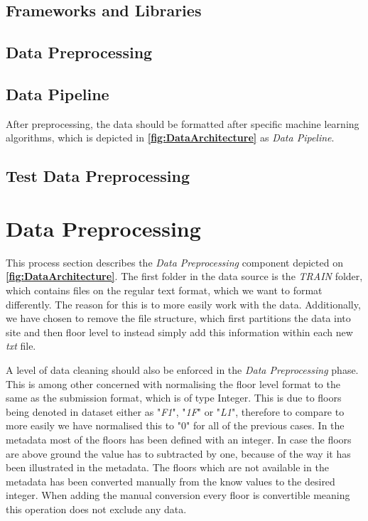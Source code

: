 

\subsection{Frameworks and Libraries}

\subsection{Data Preprocessing}


\subsection{Data Pipeline} \label{sec:datapipeline}
After preprocessing, the data should be formatted after specific machine learning algorithms, which is depicted in \textbf{\autoref{fig:DataArchitecture}} as \textit{Data Pipeline}.

\subsection{Test Data Preprocessing}


\section{Data Preprocessing}
This process section describes the \textit{Data Preprocessing} component depicted on \textbf{\autoref{fig:DataArchitecture}}. The first folder in the data source is the \textit{TRAIN} folder, which contains files on the regular text format, which we want to format differently. The reason for this is to more easily work with the data. Additionally, we have chosen to remove the file structure, which first partitions the data into site and then floor level to instead simply add this information within each new \textit{txt} file.

A level of data cleaning should also be enforced in the \textit{Data Preprocessing} phase. This is among other concerned with normalising the floor level format to the same as the submission format, which is of type Integer. This is due to floors being denoted in dataset either as "\textit{F1}", "\textit{1F}" or "\textit{L1}", therefore to compare to more easily we have normalised this to "0" for all of the previous cases. In the metadata most of the floors has been defined with an integer. In case the floors are above ground the value has to subtracted by one, because of the way it has been illustrated in the metadata. The floors which are not available in the metadata has been converted manually from the know values to the desired integer. When adding the manual conversion every floor is convertible meaning this operation does not exclude any data.

